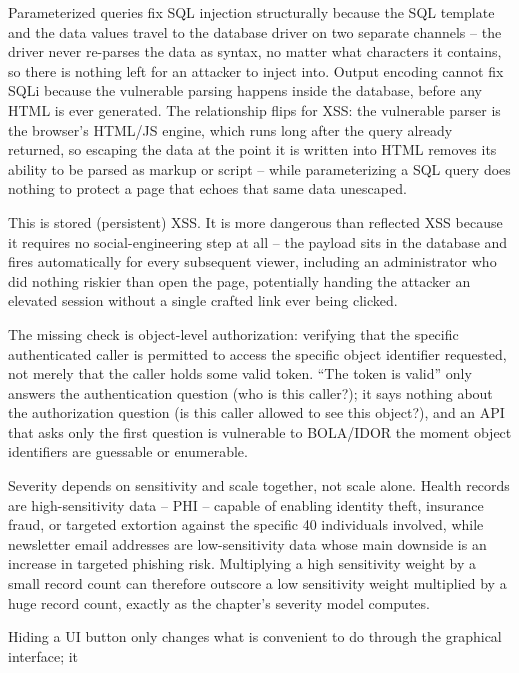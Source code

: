 \begin{answerkey}
\item Parameterized queries fix SQL injection structurally because the SQL template and the data
values travel to the database driver on two separate channels -- the driver never re-parses the
data as syntax, no matter what characters it contains, so there is nothing left for an attacker to
inject into. Output encoding cannot fix SQLi because the vulnerable parsing happens inside the
database, before any HTML is ever generated. The relationship flips for XSS: the vulnerable parser
is the browser's HTML/JS engine, which runs long after the query already returned, so escaping the
data at the point it is written into HTML removes its ability to be parsed as markup or script --
while parameterizing a SQL query does nothing to protect a page that echoes that same data
unescaped.
\item This is stored (persistent) XSS. It is more dangerous than reflected XSS because it requires
no social-engineering step at all -- the payload sits in the database and fires automatically for
every subsequent viewer, including an administrator who did nothing riskier than open the page,
potentially handing the attacker an elevated session without a single crafted link ever being
clicked.
\item The missing check is object-level authorization: verifying that the specific authenticated
caller is permitted to access the specific object identifier requested, not merely that the caller
holds some valid token. ``The token is valid'' only answers the authentication question (who is this
caller?); it says nothing about the authorization question (is this caller allowed to see this
object?), and an API that asks only the first question is vulnerable to BOLA/IDOR the moment object
identifiers are guessable or enumerable.
\item Severity depends on sensitivity and scale together, not scale alone. Health records are
high-sensitivity data -- PHI -- capable of enabling identity theft, insurance fraud, or targeted
extortion against the specific 40 individuals involved, while newsletter email addresses are
low-sensitivity data whose main downside is an increase in targeted phishing risk. Multiplying a
high sensitivity weight by a small record count can therefore outscore a low sensitivity weight
multiplied by a huge record count, exactly as the chapter's severity model computes.
\item Hiding a UI button only changes what is convenient to do through the graphical interface; it

\end{answerkey}
